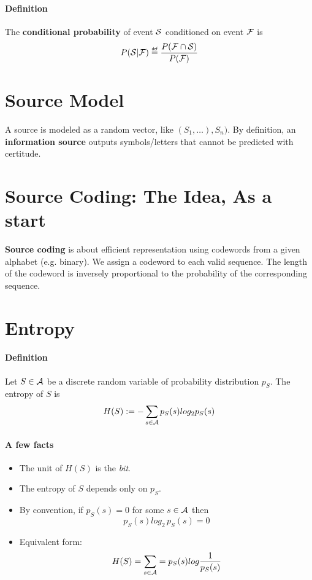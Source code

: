 \documentclass[1Opt]{report}
\newcommand\eqdef{\mathrel{\overset{\makebox[0pt]{\mbox{\normalfont\tiny\sffamily def}}}{=}}}
\begin{document}
\paragraph{Definition}
The \textbf{conditional probability} of event $\cal S$ conditioned on event $\cal F$ is
\[ P({\cal S}|{\cal F})\eqdef\frac{P({\cal F}\cap{\cal S})}{P({\cal F})}\]

\section{Source Model}
A source is modeled as a random vector, like $(S_1,\ldots),S_n)$. By definition,
an \textbf{information source} outputs symbols/letters that cannot be predicted
with certitude.

\section{Source Coding: The Idea, As a start}
\textbf{Source coding} is about efficient representation using codewords from a
given alphabet (e.g. binary). We assign a codeword to each valid sequence.
The length of the codeword is inversely proportional to the probability of
the corresponding sequence.

\section{Entropy}

\paragraph{Definition}
Let $S\in{\cal A}$ be a discrete random variable of probability distribution
$p_S$. The entropy of $S$ is
\[ H(S):=-\sum_{s\in{\cal A}}{p_S(s)log_2{p_S(s)}}\]

\paragraph{A few facts}
\begin{itemize}
  \item The unit of $H(S)$ is the \textit{bit}.
  \item The entropy of $S$ depends only on $p_S$.
  \item By convention, if $p_S(s)=0$ for some $s\in{\cal A}$ then
  \[ p_S(s)log_2\,p_S(s)=0 \]
  \item Equivalent form:
  \[ H(S)=\sum_{s\in{\cal A}}=p_S(s)log\frac{1}{p_S(s)}\]
\end{itemize}
\end{document}
